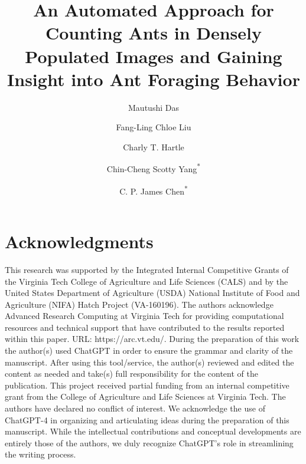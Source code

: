 \documentclass{article}
\title{An Automated Approach for Counting Ants in Densely Populated Images and Gaining Insight into Ant Foraging Behavior }
\author[1]{Mautushi Das}
\author[2]{Fang-Ling Chloe Liu}
\author[2]{Charly T. Hartle}
\author[2]{Chin-Cheng Scotty Yang\textsuperscript{*}}
\author[1]{C. P. James Chen\textsuperscript{*}}
\affil[1]{School of Animal Sciences, Virginia Tech, Blacksburg, VA 24061, USA}
\affil[2]{Department of Entomology, Virginia Tech, Blacksburg, VA 24061, USA}
\begin{document}
\maketitle









\section*{Acknowledgments}

This research was supported by the Integrated Internal Competitive Grants of the Virginia Tech College of Agriculture and Life Sciences (CALS) and by the United States Department of Agriculture (USDA) National Institute of Food and Agriculture (NIFA) Hatch Project (VA-160196). 
The authors acknowledge Advanced Research Computing at Virginia Tech for providing computational resources and technical support that have contributed to the results reported within this paper. URL: https://arc.vt.edu/. During the preparation of this work the author(s) used ChatGPT in order to ensure the grammar and clarity of the manuscript. After using this tool/service, the author(s) reviewed and edited the content as needed and take(s) full responsibility for the content of the publication.
This project received partial funding from an internal competitive grant from the College of Agriculture and Life Sciences at Virginia Tech. The authors have declared no conflict of interest. We acknowledge the use of ChatGPT-4 in organizing and articulating ideas during the preparation of this manuscript. While the intellectual contributions and conceptual developments are entirely those of the authors, we duly recognize ChatGPT’s role in streamlining the writing process.

\newpage





\newpage
\end{document}
